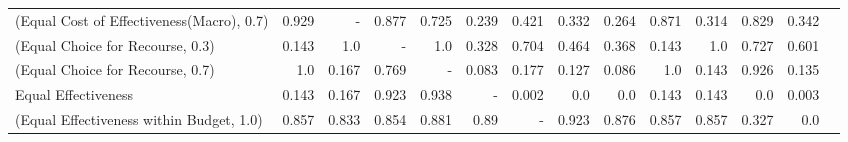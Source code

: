 \documentclass{article}
\begin{document}
\begin{table}[ht]
{\begin{tabular}{lrrrrrrrrrrrrr}
(Equal Cost of Effectiveness(Macro), 0.7)  &                                     0.929 &                                         - &                            0.877 &                            0.725 &               0.239 &                                    0.421 &                                    0.332 &                                     0.264 &                                     0.871 &                                     0.314 &                            0.829 &                                      0.342 \\
(Equal Choice for Recourse, 0.3)           &                                     0.143 &                                       1.0 &                                - &                              1.0 &               0.328 &                                    0.704 &                                    0.464 &                                     0.368 &                                     0.143 &                                       1.0 &                            0.727 &                                      0.601 \\
(Equal Choice for Recourse, 0.7)           &                                       1.0 &                                     0.167 &                            0.769 &                                - &               0.083 &                                    0.177 &                                    0.127 &                                     0.086 &                                       1.0 &                                     0.143 &                            0.926 &                                      0.135 \\
Equal Effectiveness                        &                                     0.143 &                                     0.167 &                            0.923 &                            0.938 &                   - &                                    0.002 &                                      0.0 &                                       0.0 &                                     0.143 &                                     0.143 &                              0.0 &                                      0.003 \\
(Equal Effectiveness within Budget, 1.0)   &                                     0.857 &                                     0.833 &                            0.854 &                            0.881 &                0.89 &                                        - &                                    0.923 &                                     0.876 &                                     0.857 &                                     0.857 &                            0.327 &                                        0.0 \\

\end{tabular}}
\end{table}
\end{document}
